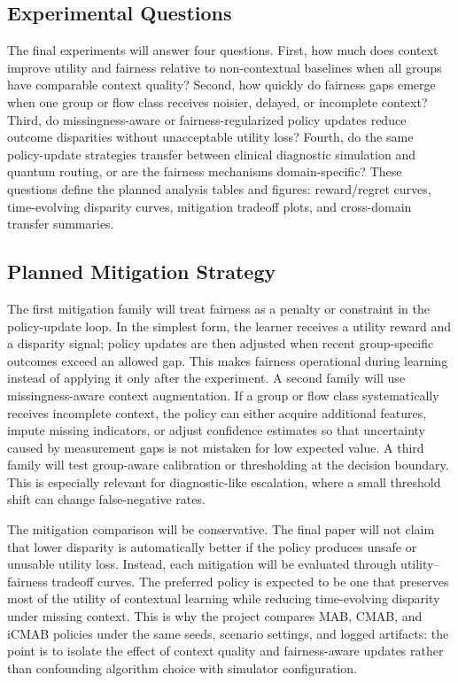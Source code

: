 \documentclass[conference]{IEEEtran}
\begin{document}
\subsection{Experimental Questions}
The final experiments will answer four questions. First, how much does context
improve utility and fairness relative to non-contextual baselines when all
groups have comparable context quality? Second, how quickly do fairness gaps
emerge when one group or flow class receives noisier, delayed, or incomplete
context? Third, do missingness-aware or fairness-regularized policy updates
reduce outcome disparities without unacceptable utility loss? Fourth, do the
same policy-update strategies transfer between clinical diagnostic simulation
and quantum routing, or are the fairness mechanisms domain-specific? These
questions define the planned analysis tables and figures: reward/regret curves,
time-evolving disparity curves, mitigation tradeoff plots, and cross-domain
transfer summaries.

\subsection{Planned Mitigation Strategy}
The first mitigation family will treat fairness as a penalty or constraint in
the policy-update loop. In the simplest form, the learner receives a utility
reward and a disparity signal; policy updates are then adjusted when recent
group-specific outcomes exceed an allowed gap. This makes fairness operational
during learning instead of applying it only after the experiment. A second
family will use missingness-aware context augmentation. If a group or flow class
systematically receives incomplete context, the policy can either acquire
additional features, impute missing indicators, or adjust confidence estimates
so that uncertainty caused by measurement gaps is not mistaken for low expected
value. A third family will test group-aware calibration or thresholding at the
decision boundary. This is especially relevant for diagnostic-like escalation,
where a small threshold shift can change false-negative rates.

The mitigation comparison will be conservative. The final paper will not claim
that lower disparity is automatically better if the policy produces unsafe or
unusable utility loss. Instead, each mitigation will be evaluated through
utility--fairness tradeoff curves. The preferred policy is expected to be one
that preserves most of the utility of contextual learning while reducing
time-evolving disparity under missing context. This is why the project compares
MAB, CMAB, and iCMAB policies under the same seeds, scenario settings, and
logged artifacts: the point is to isolate the effect of context quality and
fairness-aware updates rather than confounding algorithm choice with simulator
configuration.
\end{document}
